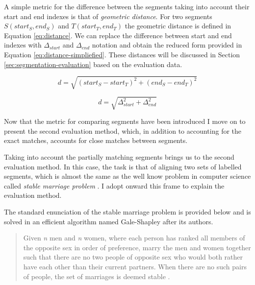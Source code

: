     
    A simple metric for the difference between the segments taking into account their start and end indexes is that of \textit{geometric distance}. For two segments $S(start_S,end_S)$ and $T(start_T,end_T)$ the geometric distance is defined in Equation \ref{eq:distance}. We can replace the difference between start and end indexes with $\varDelta_{start}$ and $\varDelta_{end}$ notation and obtain the reduced form provided in Equation \ref{eq:distance-simpliefied}. These distances will be discussed in Section \ref{sec:segmentation-evaluation} based on the evaluation data.
    
    \begin{equation} \label{eq:distance}
    d= \sqrt{(start_S - start_T)^{2}+(end_S-end_T)^{2}}
    \end{equation}
    
    \begin{equation} \label{eq:distance-simpliefied}
    d= \sqrt{\varDelta_{start} ^{2}+\varDelta_{end}^{2}}
    \end{equation}

    Now that the metric for comparing segments have been introduced I move on to present the second evaluation method, which, in addition to accounting for the exact matches, accounts for close matches between segments. 
    
    Taking into account the partially matching segments brings us to the second evaluation method. In this case, the task is that of aligning two sets of labelled segments, which is almost the same as the well know problem in computer science called \textit{stable marriage problem} \citep{Gusfield1989}. I adopt onward this frame to explain the evaluation method.
    
    The standard enunciation of the stable marriage problem is provided below and is solved in an efficient algorithm named Gale-Shapley \citep{Gale1962} after its authors.
    
    \begin{quotation}
        Given \textit{n} men and \textit{n} women, where each person has ranked all members of the opposite sex in order of preference, marry the men and women together such that there are no two people of opposite sex who would both rather have each other than their current partners. When there are no such pairs of people, the set of marriages is deemed stable \citet{iwama2008}.
    \end{quotation}

